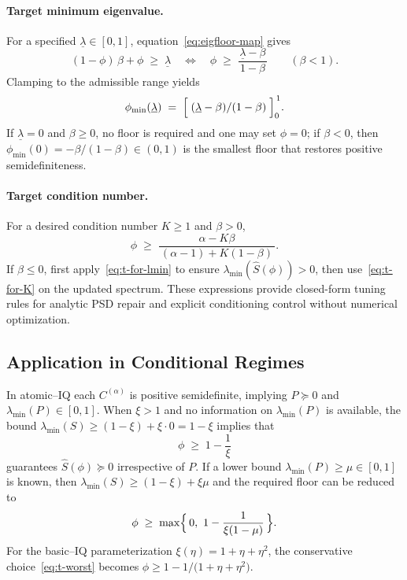 \documentclass[12pt,letterpaper]{article}
\begin{document}
\paragraph{Target minimum eigenvalue.}
For a specified \(\underline{\lambda}\in[0,1]\), equation~\eqref{eq:eigfloor-map} gives
\begin{equation}
\label{eq:t-for-lmin}
(1-\phi)\,\beta + \phi \;\ge\; \underline{\lambda}
\quad\Longleftrightarrow\quad
\phi \;\ge\; \frac{\underline{\lambda}-\beta}{\,1-\beta\,}\qquad(\beta<1).
\end{equation}
Clamping to the admissible range yields
\[
\phi_{\min}(\underline{\lambda}) \;=\; \Bigl[\;(\underline{\lambda}-\beta)/(1-\beta)\;\Bigr]_0^{\,1}.
\]
If \(\underline{\lambda}=0\) and \(\beta\ge 0\), no floor is required and one may set \(\phi=0\); if \(\beta<0\), then \(\phi_{\min}(0)=-\beta/(1-\beta)\in(0,1)\) is the smallest floor that restores positive semidefiniteness.

\paragraph{Target condition number.}
For a desired condition number \(K\ge 1\) and \(\beta>0\),
\begin{equation}
\label{eq:t-for-K}
\phi \;\ge\; \frac{\alpha-K\beta}{\,(\alpha-1)+K(1-\beta)\,}.
\end{equation}
If \(\beta\le 0\), first apply~\eqref{eq:t-for-lmin} to ensure \(\lambda_{\min}(\widehat S(\phi))>0\), then use~\eqref{eq:t-for-K} on the updated spectrum.  These expressions provide closed-form tuning rules for analytic PSD repair and explicit conditioning control without numerical optimization.

\subsection{Application in Conditional Regimes}
\label{sec:ConditionalRegimes}
In atomic–IQ each \(C^{(\alpha)}\) is positive semidefinite, implying \(P\succeq 0\) and \(\lambda_{\min}(P)\in[0,1]\).  When \(\xi>1\) and no information on \(\lambda_{\min}(P)\) is available, the bound \(\lambda_{\min}(S)\ge (1-\xi)+\xi\cdot 0 = 1-\xi\) implies that
\begin{equation}
\label{eq:t-worst}
\phi \;\ge\; 1-\frac{1}{\xi}
\end{equation}
guarantees \(\widehat S(\phi)\succeq 0\) irrespective of \(P\).  If a lower bound \(\lambda_{\min}(P)\ge \mu\in[0,1]\) is known, then \(\lambda_{\min}(S)\ge (1-\xi)+\xi\mu\) and the required floor can be reduced to
\begin{equation}
\label{eq:t-with-mu}
\phi \;\ge\; \max\Bigl\{\,0,\ 1-\frac{1}{\xi(1-\mu)}\,\Bigr\}.
\end{equation}
For the basic–IQ parameterization \(\xi(\eta)=1+\eta+\eta^2\), the conservative choice~\eqref{eq:t-worst} becomes \(\phi\ge 1-1/\bigl(1+\eta+\eta^2\bigr)\).
\end{document}

